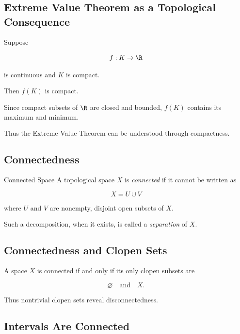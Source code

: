 \subsection{Extreme Value Theorem as a Topological Consequence}
\label{subsec:extreme-value-topological}

Suppose

\[
f:K\to\R
\]

is continuous and \(K\) is compact.

Then \(f(K)\) is compact.

Since compact subsets of \(\R\) are closed and bounded, \(f(K)\) contains
its maximum and minimum.

Thus the Extreme Value Theorem can be understood through compactness.

\subsection{Connectedness}
\label{subsec:topological-connectedness}

\begin{definitionbox}{Connected Space}
A topological space \(X\) is \emph{connected} if it cannot be written as

\[
\boxed{
X=U\cup V
}
\]

where \(U\) and \(V\) are nonempty, disjoint open subsets of \(X\).
\end{definitionbox}

Such a decomposition, when it exists, is called a \emph{separation} of
\(X\).

\subsection{Connectedness and Clopen Sets}
\label{subsec:connected-clopen}

A space \(X\) is connected if and only if its only clopen subsets are

\[
\boxed{
\varnothing
\quad\text{and}\quad
X.
}
\]

Thus nontrivial clopen sets reveal disconnectedness.

\subsection{Intervals Are Connected}
\label{subsec:intervals-connected}

